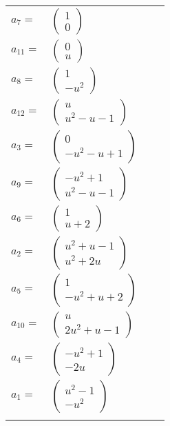 \documentclass[1p]{elsarticle_modified}
\theoremstyle{definition}
\begin{document}
\begin{tabular}{m{7pt} m{180pt} m{7pt} m{180pt} }
\flushright $a_{7}=$&$\begin{pmatrix}1\\0\end{pmatrix}$ \\
\flushright $a_{11}=$&$\begin{pmatrix}0\\u\end{pmatrix}$ \\
\flushright $a_{8}=$&$\begin{pmatrix}1\\- u^2\end{pmatrix}$ \\
\flushright $a_{12}=$&$\begin{pmatrix}u\\u^2- u-1\end{pmatrix}$ \\
\flushright $a_{3}=$&$\begin{pmatrix}0\\- u^2- u+1\end{pmatrix}$ \\
\flushright $a_{9}=$&$\begin{pmatrix}- u^2+1\\u^2- u-1\end{pmatrix}$ \\
\flushright $a_{6}=$&$\begin{pmatrix}1\\u+2\end{pmatrix}$ \\
\flushright $a_{2}=$&$\begin{pmatrix}u^2+u-1\\u^2+2 u\end{pmatrix}$ \\
\flushright $a_{5}=$&$\begin{pmatrix}1\\- u^2+u+2\end{pmatrix}$ \\
\flushright $a_{10}=$&$\begin{pmatrix}u\\2 u^2+u-1\end{pmatrix}$ \\
\flushright $a_{4}=$&$\begin{pmatrix}- u^2+1\\-2 u\end{pmatrix}$ \\
\flushright $a_{1}=$&$\begin{pmatrix}u^2-1\\- u^2\end{pmatrix}$\\&\end{tabular}
\end{document}

